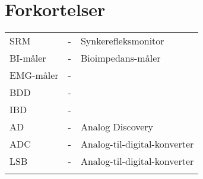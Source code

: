 \chapter{Forkortelser}

\begin{table}[H]
\center
{}
\begin{tabularx}{\linewidth}{l l X}	
SRM         & - &   Synkerefleksmonitor \\ \addlinespace[2mm]
BI-måler         & - &   Bioimpedans-måler \\ \addlinespace[2mm]
EMG-måler   & - &    \\ \addlinespace[2mm]
BDD   & - &    \\ \addlinespace[2mm]
IBD  & - &    \\ \addlinespace[2mm]
AD  & - &  Analog Discovery  \\ \addlinespace[2mm]
ADC  & - &  Analog-til-digital-konverter  \\ \addlinespace[2mm]
LSB  & - &  Analog-til-digital-konverter  \\ \addlinespace[2mm]

\end{tabularx}
\end{table}